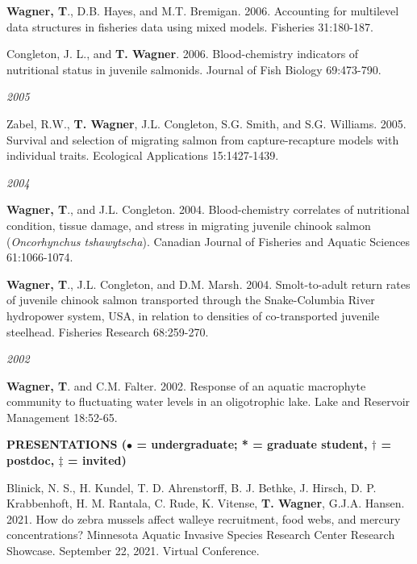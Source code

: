 \documentclass[10pt]{article}
\begin{document}
\begin{flushleft}
\begin{etaremune}[start=7]
\item {\bf Wagner, T}., D.B. Hayes, and M.T. Bremigan. 2006. Accounting for multilevel data structures in fisheries data using mixed models. Fisheries 31:180-187.

\item Congleton, J. L., and {\bf T. Wagner}. 2006. Blood-chemistry indicators of nutritional status in juvenile salmonids. Journal of Fish Biology 69:473-790.

\end{etaremune}
\emph{2005}
\begin{etaremune}[start=4]
\item Zabel, R.W., {\bf T. Wagner}, J.L. Congleton, S.G. Smith, and S.G. Williams. 2005. Survival and selection of migrating salmon from capture-recapture models with individual traits. Ecological Applications 15:1427-1439. 

\end{etaremune}
\emph{2004}
\begin{etaremune}[start=3]
\item {\bf Wagner, T}., and J.L. Congleton. 2004. Blood-chemistry correlates of nutritional condition, tissue damage, and stress in migrating juvenile chinook salmon (\emph{Oncorhynchus tshawytscha}). Canadian Journal of Fisheries and Aquatic Sciences 61:1066-1074.

\item {\bf Wagner, T}., J.L. Congleton, and D.M. Marsh. 2004. Smolt-to-adult return rates of juvenile chinook salmon transported through the Snake-Columbia River hydropower system, USA, in relation to densities of co-transported juvenile steelhead. Fisheries Research 68:259-270.

\end{etaremune}
\emph{2002}
\begin{etaremune}[start=1]
\item {\bf Wagner, T}. and C.M. Falter. 2002. Response of an aquatic macrophyte community to fluctuating water levels in an oligotrophic lake. Lake and Reservoir Management 18:52-65.
\end{etaremune}

\vspace{8pt}
\centerline {\bf{PRESENTATIONS ({\small $\bullet$ = undergraduate; * = graduate student, $\dagger$ = postdoc, $\ddagger$ = invited})}}
\vspace{5pt}
\begin{etaremune}

\item Blinick, N. S., H. Kundel, T. D. Ahrenstorff, B. J. Bethke, J. Hirsch, D. P. Krabbenhoft, H. M. Rantala, C. Rude, K. Vitense, \textbf{T. Wagner}, G.J.A. Hansen.  2021. How do zebra mussels affect walleye recruitment, food webs, and mercury concentrations? Minnesota Aquatic Invasive Species Research Center Research Showcase. September 22, 2021. Virtual Conference. 


\end{etaremune}
\end{flushleft}
\end{document}
